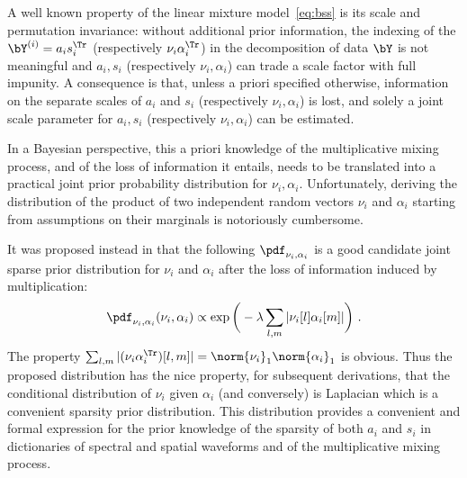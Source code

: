 A well known property of the linear mixture model~\eqref{eq:bss} is its scale and permutation invariance:  without additional prior information, the indexing of the ${\bY^{(i)}}=a_is_i^\Tr$ (respectively ${\nu}_i{\alpha}_i^\Tr$) in the decomposition of data $\bY$ is not meaningful and $a_i, s_i$ (respectively $ \nu_i , \alpha_i$) can trade a scale factor with full impunity. A consequence is that, unless a priori specified otherwise, information on the separate scales of  $a_i$ and $s_i$ (respectively $ \nu_i , \alpha_i$) is lost, and solely a joint scale parameter for $a_i, s_i$ (respectively $ \nu_i , \alpha_i$)  can be estimated. 

In a Bayesian perspective, this a priori knowledge of the multiplicative mixing process, and of the loss of information it entails, needs to be translated into a practical joint prior probability distribution for  $ \nu_i , \alpha_i$. Unfortunately, deriving the distribution of the product of two independent random vectors $\nu_i$ and $\alpha_i$ starting from assumptions on their marginals is notoriously cumbersome. 

It was proposed instead in \citet{bobin08_aiep} that the following $\pdf_{\nu_i,\alpha_i}$ is a good candidate joint sparse prior distribution for  $\nu_i$ and $\alpha_i$  after the loss of information induced by multiplication: 
\begin{equation}
\pdf_{\nu_i,\alpha_i}(\nu_i, \alpha_i) \propto \exp \bigg( - \lambda \sum_{l,m} | \nu_i[l] \alpha_i[m] |\bigg) ~ .
\end{equation} 
The property $\sum_{l,m}|(\nu_i \alpha_i^\Tr)[l,m]| = \norm{\nu_i}_1 \norm{\alpha_i}_1$ is obvious. Thus the proposed distribution has the nice property, for subsequent derivations, that the conditional distribution of $\nu_i$ given $\alpha_i$ (and conversely) is Laplacian which is a convenient sparsity prior distribution. This distribution provides a convenient and formal expression for the prior knowledge of the sparsity of both $a_i$ and $s_i$ in dictionaries of spectral and spatial waveforms and of the multiplicative mixing process. 

